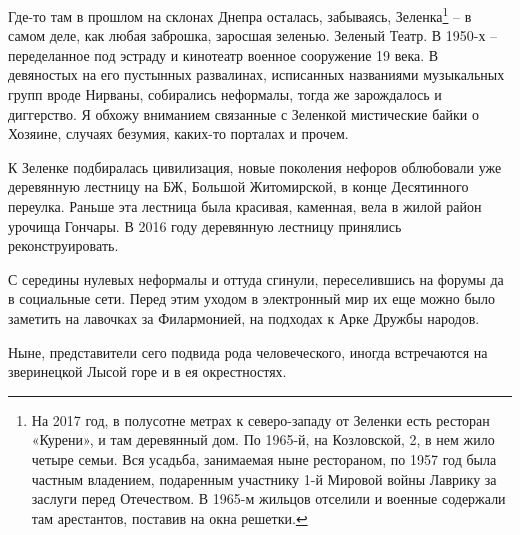 Где-то там в прошлом на склонах Днепра осталась, забываясь, Зеленка\footnote{На 2017 год, в полусотне метрах к северо-западу от Зеленки есть ресторан «Курени», и там деревянный дом. По 1965-й, на Козловской, 2, в нем жило четыре семьи. Вся усадьба, занимаемая ныне рестораном, по 1957 год была частным владением, подаренным участнику 1-й Мировой войны Лаврику за заслуги перед Отечеством. В 1965-м жильцов отселили и военные содержали там арестантов, поставив на окна решетки.} – в самом деле, как любая заброшка, заросшая зеленью. Зеленый Театр. В 1950-х – переделанное под эстраду и кинотеатр военное сооружение 19 века. В девяностых на его пустынных развалинах, исписанных названиями музыкальных групп вроде Нирваны, собирались неформалы, тогда же зарождалось и диггерство. Я обхожу вниманием связанные с Зеленкой мистические байки о Хозяине, случаях безумия, каких-то порталах и прочем.


К Зеленке подбиралась цивилизация, новые поколения нефоров облюбовали уже деревянную лестницу на БЖ, Большой Житомирской, в конце Десятинного переулка. Раньше эта лестница была красивая, каменная, вела в жилой район урочища Гончары. В 2016 году деревянную лестницу принялись реконструировать.

С середины нулевых неформалы и оттуда сгинули, переселившись на форумы да в социальные сети. Перед этим уходом в электронный мир их еще можно было заметить на лавочках за Филармонией, на подходах к Арке Дружбы народов.

Ныне, представители сего подвида рода человеческого, иногда встречаются на зверинецкой Лысой горе и в ея окрестностях.
